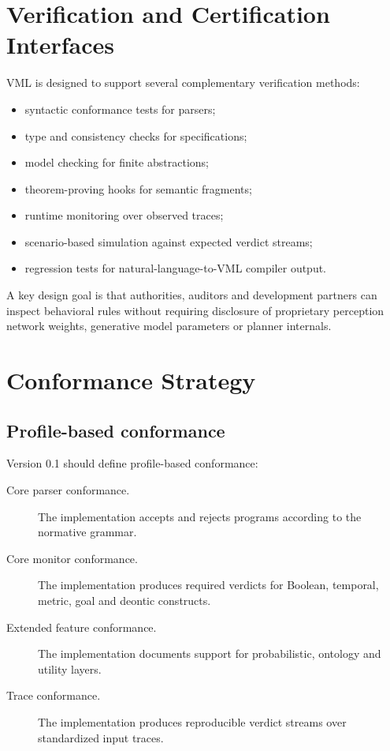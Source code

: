 \documentclass[11pt,a4paper]{article}
\newcommand{\VML}{\textsc{VML}}
\begin{document}
\section{Verification and Certification Interfaces}
\VML{} is designed to support several complementary verification methods:
\begin{itemize}
  \item syntactic conformance tests for parsers;
  \item type and consistency checks for specifications;
  \item model checking for finite abstractions;
  \item theorem-proving hooks for semantic fragments;
  \item runtime monitoring over observed traces;
  \item scenario-based simulation against expected verdict streams;
  \item regression tests for natural-language-to-\VML{} compiler output.
\end{itemize}

A key design goal is that authorities, auditors and development partners can inspect behavioral rules without requiring disclosure of proprietary perception network weights, generative model parameters or planner internals.

\section{Conformance Strategy}
\subsection{Profile-based conformance}
Version 0.1 should define profile-based conformance:
\begin{description}
  \item[Core parser conformance.] The implementation accepts and rejects programs according to the normative grammar.
  \item[Core monitor conformance.] The implementation produces required verdicts for Boolean, temporal, metric, goal and deontic constructs.
  \item[Extended feature conformance.] The implementation documents support for probabilistic, ontology and utility layers.
  \item[Trace conformance.] The implementation produces reproducible verdict streams over standardized input traces.
\end{description}
\end{document}
